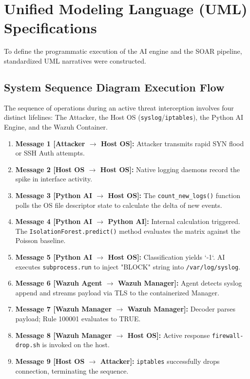 \documentclass[12pt, a4paper]{report}
\begin{document}
	\newpage
	\section{Unified Modeling Language (UML) Specifications}
	To define the programmatic execution of the AI engine and the SOAR pipeline, standardized UML narratives were constructed.
	
	\subsection{System Sequence Diagram Execution Flow}
	The sequence of operations during an active threat interception involves four distinct lifelines: The Attacker, the Host OS (\texttt{syslog}/\texttt{iptables}), the Python AI Engine, and the Wazuh Container.
	
	\begin{enumerate}
		\item \textbf{Message 1 [Attacker $\rightarrow$ Host OS]:} Attacker transmits rapid SYN flood or SSH Auth attempts.
		\item \textbf{Message 2 [Host OS $\rightarrow$ Host OS]:} Native logging daemons record the spike in interface activity.
		\item \textbf{Message 3 [Python AI $\rightarrow$ Host OS]:} The \texttt{count\_new\_logs()} function polls the OS file descriptor state to calculate the delta of new events.
		\item \textbf{Message 4 [Python AI $\rightarrow$ Python AI]:} Internal calculation triggered. The \texttt{IsolationForest.predict()} method evaluates the matrix against the Poisson baseline.
		\item \textbf{Message 5 [Python AI $\rightarrow$ Host OS]:} Classification yields `-1`. AI executes \texttt{subprocess.run} to inject "BLOCK" string into \texttt{/var/log/syslog}.
		\item \textbf{Message 6 [Wazuh Agent $\rightarrow$ Wazuh Manager]:} Agent detects syslog append and streams payload via TLS to the containerized Manager.
		\item \textbf{Message 7 [Wazuh Manager $\rightarrow$ Wazuh Manager]:} Decoder parses payload; Rule 100001 evaluates to TRUE.
		\item \textbf{Message 8 [Wazuh Manager $\rightarrow$ Host OS]:} Active response \texttt{firewall-drop.sh} is invoked on the host.
		\item \textbf{Message 9 [Host OS $\rightarrow$ Attacker]:} \texttt{iptables} successfully drops connection, terminating the sequence.
	\end{enumerate}
	
\end{document}
